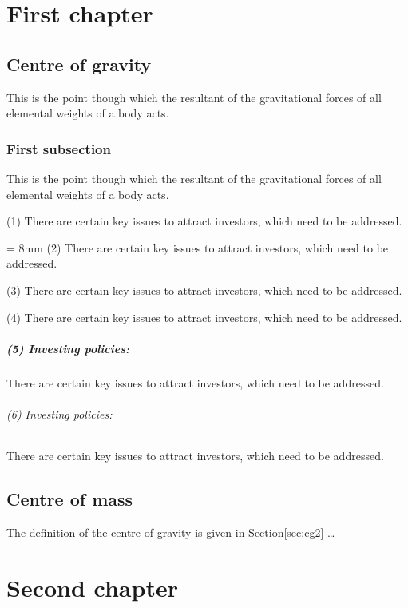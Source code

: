 \documentclass[a4paper]{book}
\begin{document}
\chapter{First chapter}
\section{Centre of gravity}\label{sec:cg}
This is the point though which the resultant
of the gravitational forces of all elemental
weights of a body acts.
\subsection{First subsection}
This is the point though which the resultant
of the gravitational forces of all elemental
weights of a body acts.
\par
(1) There are certain key issues to attract
investors, which need to be addressed.
%
\par \parindent = 8mm
(2) There are certain key issues to attract
investors, which need to be addressed.
%
\par \noindent \parskip 2mm
(3) There are certain key issues to attract
investors, which need to be addressed.
\par
(4) There are certain key issues to attract
investors, which need to be addressed.
%
\paragraph{(5) Investing policies:}
There are certain key issues to attract
investors, which need to be addressed.
%
\subparagraph{(6) Investing policies:}
There are certain key issues to attract
investors, which need to be addressed.
\section{Centre of mass}\label{sec-ex}
The definition of the centre of gravity is
given in Section\ref{sec:cg2} …
\chapter{Second chapter}
\end{document}
